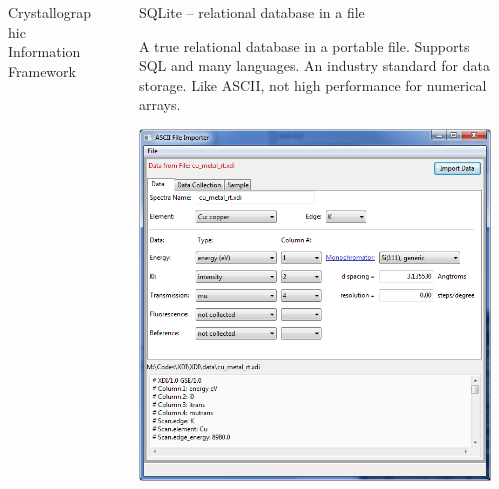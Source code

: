 \documentclass[final]{beamer}
\begin{document}
\begin{frame}{}
\begin{columns}[t]
\begin{column}{.34\linewidth}
\begin{block}{Crystallographic Information Framework}
         \vspace{10mm} {\ }  \vspace{10mm} {\ }

        \end{block}
      \end{column}
      \begin{column}{.01\linewidth}
      \end{column}
      \begin{column}{.31\linewidth}
        \begin{block}{SQLite -- relational database in a file}

          \justifying A true relational database in a portable file. Supports
          SQL and many languages.  An industry standard for
          data storage. Like ASCII, not high performance for numerical
          arrays.

         \vspace{6mm}

         \begin{center}
           \includegraphics[width=0.7\linewidth]{sqlite.png}
         \end{center}

         \vspace{10mm} {\ }   \vspace{10mm} {\ }


        \end{block}
      \end{column}
      \begin{column}{.01\linewidth}
      \end{column}

    \end{columns}
  \end{frame}
\end{document}
